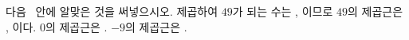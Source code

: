 다음 \blank\ 안에 알맞은 것을 써넣으시오.
 제곱하여 $49$가 되는 수는 \blank, \blank[2.2em]이므로 $49$의 제곱근은 \blank, \blank[2.2em]이다.
 $0$의 제곱근은 .
 $-9$의 제곱근은 \blank[2.2em].
